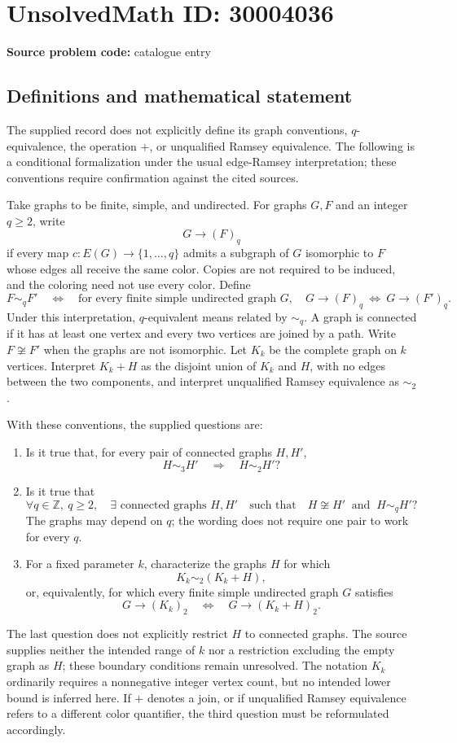 \documentclass[11pt]{article}
\newcommand{\Z}{\mathbb{Z}}
\begin{document}
\section*{UnsolvedMath ID: 30004036}
\textbf{Source problem code:} catalogue entry
\subsection{Definitions and mathematical statement}
The supplied record does not explicitly define its graph conventions, \(q\)-equivalence, the operation \(+\), or unqualified Ramsey equivalence. The following is a conditional formalization under the usual edge-Ramsey interpretation; these conventions require confirmation against the cited sources.

Take graphs to be finite, simple, and undirected. For graphs \(G,F\) and an integer \(q\geq2\), write
\[
G\longrightarrow(F)_q
\]
if every map \(c:E(G)\to\{1,\ldots,q\}\) admits a subgraph of \(G\) isomorphic to \(F\) whose edges all receive the same color. Copies are not required to be induced, and the coloring need not use every color. Define
\[
F\sim_q F'
\quad\Longleftrightarrow\quad
\text{for every finite simple undirected graph }G,
\quad
G\longrightarrow(F)_q\ \Longleftrightarrow\ G\longrightarrow(F')_q.
\]
Under this interpretation, \(q\)-equivalent means related by \(\sim_q\). A graph is connected if it has at least one vertex and every two vertices are joined by a path. Write \(F\not\cong F'\) when the graphs are not isomorphic. Let \(K_k\) be the complete graph on \(k\) vertices. Interpret \(K_k+H\) as the disjoint union of \(K_k\) and \(H\), with no edges between the two components, and interpret unqualified Ramsey equivalence as \(\sim_2\).

With these conventions, the supplied questions are:
\begin{enumerate}
\item Is it true that, for every pair of connected graphs \(H,H'\),
\[
H\sim_3 H'\quad\Longrightarrow\quad H\sim_2 H'?
\]
\item Is it true that
\[
\forall q\in\Z,\ q\geq2,\quad
\exists\text{ connected graphs }H,H'
\quad\text{such that}\quad
H\not\cong H'\ \text{ and }\ H\sim_q H'?
\]
The graphs may depend on \(q\); the wording does not require one pair to work for every \(q\).
\item For a fixed parameter \(k\), characterize the graphs \(H\) for which
\[
K_k\sim_2(K_k+H),
\]
or, equivalently, for which every finite simple undirected graph \(G\) satisfies
\[
G\longrightarrow(K_k)_2
\quad\Longleftrightarrow\quad
G\longrightarrow(K_k+H)_2.
\]
\end{enumerate}
The last question does not explicitly restrict \(H\) to connected graphs. The source supplies neither the intended range of \(k\) nor a restriction excluding the empty graph as \(H\); these boundary conditions remain unresolved. The notation \(K_k\) ordinarily requires a nonnegative integer vertex count, but no intended lower bound is inferred here. If \(+\) denotes a join, or if unqualified Ramsey equivalence refers to a different color quantifier, the third question must be reformulated accordingly.
\end{document}
